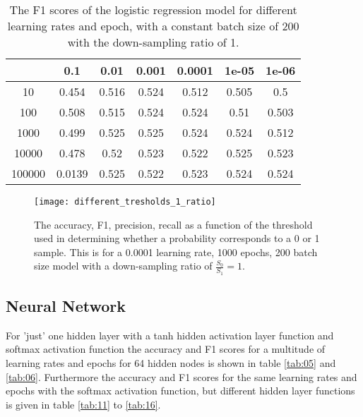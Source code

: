 \documentclass[uio,jmp,amsmath,amssymb,reprint,nofootinbib]{revtex4-1}
\numberwithin{equation}{section}
\begin{document}
\begin{table}[H]
\caption{The F1 scores of the logistic regression model for different learning rates and epoch, with a constant batch size of 200 with the down-sampling ratio of 1.}
\begin{tabular}{|c|c|c|c|c|c|c|}\hline
  & 0.1 & 0.01 & 0.001 & 0.0001 & 1e-05 & 1e-06 \\ \hline
10 & 0.454 & 0.516 & 0.524 & 0.512 & 0.505 & 0.5 \\ \hline
100 & 0.508 & 0.515 & 0.524 & 0.524 & 0.51 & 0.503 \\ \hline
1000 & 0.499 & 0.525 & 0.525 & 0.524 & 0.524 & 0.512 \\ \hline
10000 & 0.478 & 0.52 & 0.523 & 0.522 & 0.525 & 0.523 \\ \hline
100000 & 0.0139 & 0.525 & 0.522 & 0.523 & 0.524 & 0.524 \\ \hline
\end{tabular}
\label{tab:04}
\end{table}

\begin{figure}[H]
    \centering
    \texttt{[image: different\_tresholds\_1\_ratio]}
    \caption{The accuracy, F1, precision, recall as a function of the threshold used in determining whether a probability corresponds to a 0 or 1 sample. This is for a 0.0001 learning rate, 1000 epochs, 200 batch size model with a down-sampling ratio of \(\frac{S_0}{S_1} = 1\).}
    \label{fig:04}
\end{figure}


\subsection{Neural Network}

For 'just' one hidden layer with a tanh hidden activation layer function and softmax activation function the accuracy and F1 scores for a multitude of learning rates and epochs for 64 hidden nodes is shown in table \ref{tab:05} and \ref{tab:06}. Furthermore the accuracy and F1 scores for the same learning rates and epochs with the softmax activation function, but different hidden layer functions is given in table \ref{tab:11} to \ref{tab:16}.
\end{document}
